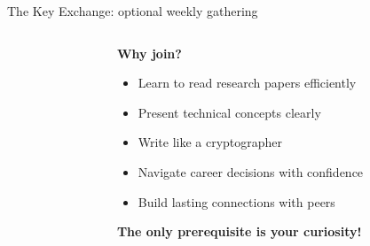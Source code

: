 \documentclass[aspectratio=169, lualatex, handout]{beamer}
\begin{document}
\begin{frame}{The Key Exchange: optional weekly gathering}
	\begin{columns}[c]
		\begin{column}{0.5\textwidth}
		\end{column}
		\begin{column}{0.5\textwidth}
			\textbf{Why join?}
			\begin{itemize}[<+->]
				\item Learn to read research papers efficiently
				\item Present technical concepts clearly
				\item Write like a cryptographer
				\item Navigate career decisions with confidence
				\item Build lasting connections with peers
			\end{itemize}
			\vspace{0.5cm}
			\textcolor{cipherprimary}{\textbf{The only prerequisite is your curiosity!}}
		\end{column}
	\end{columns}
\end{frame}
\end{document}
